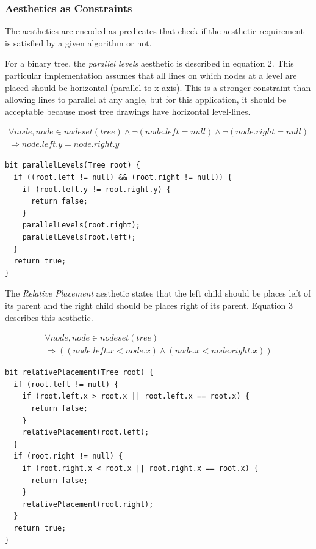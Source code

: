 \documentclass{article}
\begin{document}
\subsubsection{Aesthetics as Constraints}

The aesthetics are encoded as predicates that check if the aesthetic
requirement is satisfied by a given algorithm or not.

For a binary tree, the \textit{parallel levels} aesthetic is described
in equation 2.  This particular implementation assumes that all lines
on which nodes at a level are placed should be horizontal (parallel to
x-axis).  This is a stronger constraint than allowing lines to
parallel at any angle, but for this application, it should be
acceptable because most tree drawings have horizontal level-lines.

\begin{equation}
  \begin{split}
    \forall node, node \in nodeset(tree) \wedge \neg (node.left = null) \wedge \neg (node.right = null)\\
    \Longrightarrow node.left.y = node.right.y
  \end{split}
\end{equation}

\begin{verbatim}
bit parallelLevels(Tree root) {
  if ((root.left != null) && (root.right != null)) {
    if (root.left.y != root.right.y) {
      return false;
    }
    parallelLevels(root.right);
    parallelLevels(root.left);
  }
  return true;
}
\end{verbatim}

The \textit{Relative Placement} aesthetic states that the left child
should be places left of its parent and the right child should be
places right of its parent.  Equation 3 describes this aesthetic.


\begin{equation}
  \begin{split}
    \forall node, node \in nodeset(tree) \\
    \Longrightarrow ((node.left.x < node.x) \wedge (node.x < node.right.x))
  \end{split}
\end{equation}


\begin{verbatim}
bit relativePlacement(Tree root) {
  if (root.left != null) {
    if (root.left.x > root.x || root.left.x == root.x) {
      return false;
    }
    relativePlacement(root.left);
  }  
  if (root.right != null) {
    if (root.right.x < root.x || root.right.x == root.x) {
      return false;
    }
    relativePlacement(root.right); 
  }
  return true;
}
\end{verbatim}
\end{document}
